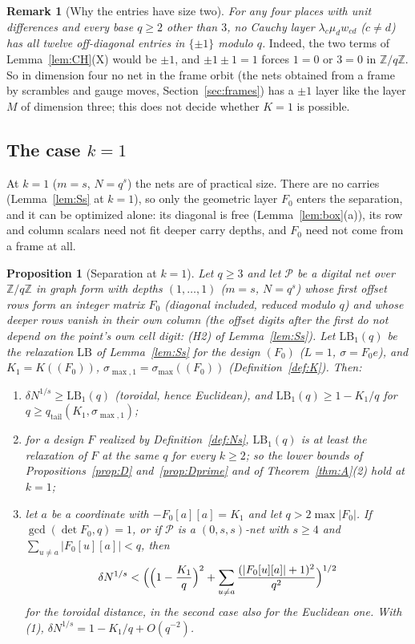 \documentclass[11pt]{amsart}
\newtheorem{proposition}[theorem]{Proposition}
\theoremstyle{definition}
\newtheorem{remark}[theorem]{Remark}
\theoremstyle{plain}
\newcommand{\Z}{\mathbb{Z}}
\begin{document}
\begin{remark}[Why the entries have size two]\label{rem:pm1}
\emph{For any four places with unit differences and every base $q\ge2$ other than $3$, no Cauchy layer $\lambda_c\mu_dw_{cd}$ ($c\ne d$) has all twelve off-diagonal entries in $\{\pm1\}$ modulo $q$.} Indeed, the two terms of Lemma~\ref{lem:CH}(X) would be $\pm1$, and $\pm1\pm1=1$ forces $1=0$ or $3=0$ in $\Z/q\Z$. So in dimension four no net in the frame orbit (the nets obtained from a frame by scrambles and gauge moves, Section~\ref{sec:frames}) has a $\pm1$ layer like the layer $M$ of dimension three; this does not decide whether $K=1$ is possible.
\end{remark}

\subsection{The case \texorpdfstring{$k=1$}{k=1}}\label{sec:k1}
At $k=1$ ($m=s$, $N=q^s$) the nets are of practical size. There are no carries (Lemma~\ref{lem:Ss} at $k=1$), so only the geometric layer $F_0$ enters the separation, and it can be optimized alone: its diagonal is free (Lemma~\ref{lem:box}(a)), its row and column scalars need not fit deeper carry depths, and $F_0$ need not come from a frame at all.

\begin{proposition}[Separation at $k=1$]\label{prop:k1}
Let $q\ge3$ and let $\mathcal P$ be a digital net over $\Z/q\Z$ in graph form with depths $(1,\dots,1)$ ($m=s$, $N=q^s$) whose first offset rows form an integer matrix $F_0$ (diagonal included, reduced modulo $q$) and whose deeper rows vanish in their own column (the offset digits after the first do not depend on the point's own cell digit: (H2) of Lemma~\ref{lem:Ss}). Let $\mathrm{LB}_1(q)$ be the relaxation $\mathrm{LB}$ of Lemma~\ref{lem:Ss} for the design $(F_0)$ ($L=1$, $\sigma=F_0e$), and $K_1=K((F_0))$, $\sigma_{\max,1}=\sigma_{\max}((F_0))$ (Definition~\ref{def:K}). Then:
\begin{enumerate}
\item $\delta N^{1/s}\ge\mathrm{LB}_1(q)$ (toroidal, hence Euclidean), and $\mathrm{LB}_1(q)\ge1-K_1/q$ for $q\ge q_{\mathrm{tail}}(K_1,\sigma_{\max,1})$;
\item for a design $F$ realized by Definition~\ref{def:Ns}, $\mathrm{LB}_1(q)$ is at least the relaxation of $F$ at the same $q$ for every $k\ge2$; so the lower bounds of Propositions~\ref{prop:D} and~\ref{prop:Dprime} and of Theorem~\ref{thm:A}(2) hold at $k=1$;
\item let $a$ be a coordinate with $-F_0[a][a]=K_1$ and let $q>2\max|F_0|$. If $\gcd(\det F_0,q)=1$, or if $\mathcal P$ is a $(0,s,s)$-net with $s\ge4$ and $\sum_{u\ne a}|F_0[u][a]|<q$, then
\[
\delta N^{1/s}<\Bigl(\Bigl(1-\frac{K_1}q\Bigr)^2+\sum_{u\ne a}\frac{(|F_0[u][a]|+1)^2}{q^2}\Bigr)^{1/2}
\]
for the toroidal distance, in the second case also for the Euclidean one. With (1), $\delta N^{1/s}=1-K_1/q+O(q^{-2})$.
\end{enumerate}
\end{proposition}
\end{document}
